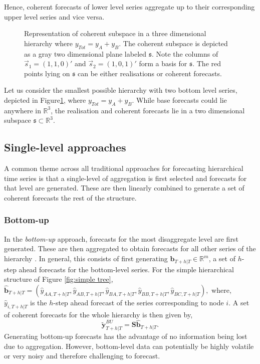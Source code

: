 \documentclass[graybox]{svmult}
\begin{document}
Hence, coherent forecasts of lower level series aggregate up to their corresponding upper level series and vice versa.

\begin{figure}[t]
	\centering
	\vspace{-0.9cm}
	\small
	\resizebox{\linewidth}{!}{
	
}
	\caption{Representation of coherent subspace in a three dimensional hierarchy where $y_{Tot} = y_A + y_B$. The coherent subspace is depicted as a gray two dimensional plane labeled $\mathfrak{s}$. Note the columns of $\vec{s}_1 = (1,1,0)'$ and $\vec{s}_2 = (1, 0, 1)'$ form a basis for $\mathfrak{s}$. The red points lying on $\mathfrak{s}$ can be either realisations or coherent forecasts. }\label{fig:Schematic-3D}

\end{figure}

Let us consider the smallest possible hierarchy with two bottom level series, depicted in Figure\ref{fig:Schematic-3D}, where $y_{Tot} = y_A + y_B$. While base forecasts could lie anywhere in $\mathbb{R}^3$, the realisation and coherent forecasts lie in a two dimensional subspace $\mathfrak{s}\subset \mathbb{R}^3$.

\subsection{Single-level approaches}\label{sec:single level approaches}
A common theme across all traditional approaches for forecasting hierarchical time series is that a single-level of aggregation is first selected and forecasts for that level are generated. These are then linearly combined to generate a set of coherent forecasts the rest of the structure.

\subsubsection{Bottom-up}

In the \textit{bottom-up} approach, forecasts for the most disaggregate level are first generated. These are then aggregated to obtain forecasts for all other series of the hierarchy \citep{dunn1976}. In general, this consists of first generating $\hat{\bm{b}}_{T+h|T} \in \mathbb{R}^m$, a set of $h$-step ahead forecasts for the bottom-level series. For the simple hierarchical structure of Figure \ref{fig:simple tree}, $\hat{\bm{b}}_{T+h|T} = (\hat{{y}}_{AA,T+h|T}, \hat{{y}}_{AB,T+h|T}, \hat{{y}}_{BA,T+h|T}, \hat{{y}}_{BB,T+h|T},\hat{{y}}_{BC,T+h|T}),$ where, $\hat{{y}}_{i,T+h|T}$ is the $h$-step ahead forecast of the series corresponding to node $i$. A set of coherent forecasts for the whole hierarchy is then given by,
\begin{equation*}\label{eq:BU}
\tilde{\bm{y}}^{BU}_{T+h|T}=\bm{S\hat{\bm{b}}}_{T+h|T}.
\end{equation*}
Generating bottom-up forecasts has the advantage of no information being lost due to aggregation. However, bottom-level data can potentially be highly volatile or very noisy and therefore challenging to forecast.
\end{document}
